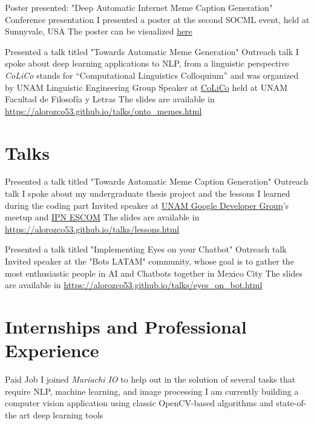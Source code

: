 \documentclass[10pt,a4paper,sans]{moderncv} %
\begin{document}
        {Poster presented: "Deep Automatic Internet Meme Caption Generation"}
        {Conference presentation}
        {I presented a poster at the second SOCML event, held at Sunnyvale, USA}
        {The poster can be visualized \href{https://drive.google.com/file/d/1DPjqiXcmliwPZBOfBIXxnIX_rs9EPUub/view?usp=sharing}{here}}
        {}

        {Presented a talk titled "Towards Automatic Meme Generation"}
        {Outreach talk}
        {I spoke about deep learning applications to NLP, from a linguistic perspective}
        {\emph{CoLiCo} stands for ``Computational Linguistics Colloquium'' and was organized by UNAM Linguistic Engineering Group
          Speaker at \href{http://www.corpus.unam.mx/colico/VIIICoLiCo.html}{CoLiCo} held at UNAM Facultad de Filosofía y Letras}
        {The slides are available in \url{https://alorozco53.github.io/talks/onto_memes.html}}


\section{Talks}

        {Presented a talk titled "Towards Automatic Meme Caption Generation"}
        {Outreach talk}
        {I spoke about my undergraduate thesis project and the lessons I learned during the coding part}
        {Invited speaker at \href{https://www.meetup.com/GDG-UNAM/}{UNAM Google Developer Group}'s meetup and \href{http://www.escom.ipn.mx}{IPN ESCOM}}
        {The slides are available in \url{https://alorozco53.github.io/talks/lessons.html}}

        {Presented a talk titled "Implementing Eyes on your Chatbot"}
        {Outreach talk}
        {Invited speaker at the "Bots LATAM" community, whose goal is to gather the most enthusiastic people in AI and Chatbots together in Mexico City}
        {}
        {The slides are available in \url{https://alorozco53.github.io/talks/eyes_on_bot.html}}


\section{Internships and Professional Experience}

        {Paid Job}
        {I joined \emph{Mariachi IO} to help out in the solution of several tasks that require NLP, machine learning, and image processing}
        {I am currently building a computer vision application using classic OpenCV-based algorithms and state-of-the art deep learning tools}
        {}
        {}
\end{document}
